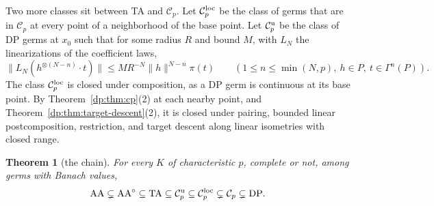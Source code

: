 \documentclass[11pt]{amsart}
\newtheorem{theorem}{Theorem}[section]
\theoremstyle{definition}
\theoremstyle{remark}
\numberwithin{equation}{section}
\newcommand{\norm}[1]{\lVert #1\rVert}
\newcommand{\cC}{\mathcal{C}}
\theoremstyle{plain}
\theoremstyle{definition}
\theoremstyle{plain}
\begin{document}
Two more classes sit between TA and $\cC_p$. Let $\cC_p^{\rm loc}$ be the class of germs that are in $\cC_p$ at every point of a neighborhood of the base point. Let $\cC_p^{\rm u}$ be the class of DP germs at $x_0$ such that for some radius $R$ and bound $M$, with $L_N$ the linearizations of the coefficient laws,
\begin{equation}\label{dp:eq:cpu}
 \norm{L_N(h^{\otimes(N-n)}\cdot t)}\le MR^{-N}\norm h^{N-n}\pi(t)\qquad(1\le n\le\min(N,p),\ h\in P,\ t\in\Gamma^n(P)).
\end{equation}
The class $\cC_p^{\rm loc}$ is closed under composition, as a DP germ is continuous at its base point. By Theorem~\ref{dp:thm:cp}(2) at each nearby point, and Theorem~\ref{dp:thm:target-descent}(2), it is closed under pairing, bounded linear postcomposition, restriction, and target descent along linear isometries with closed range.

\begin{theorem}[the chain]\label{dp:thm:chain}
For every $K$ of characteristic $p$, complete or not, among germs with Banach values,
\[
 \mathrm{AA}\subsetneq\mathrm{AA}^\circ\subseteq\mathrm{TA}\subseteq\cC_p^{\rm u}\subseteq\cC_p^{\rm loc}\subsetneq\cC_p\subsetneq\mathrm{DP}.
\]
\end{theorem}
\end{document}
